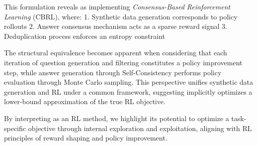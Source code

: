 This formulation reveals {\langname} as implementing \textit{Consensus-Based Reinforcement Learning} (CBRL), where:  
1. Synthetic data generation corresponds to policy rollouts  
2. Answer consensus mechanism acts as a sparse reward signal  
3. Deduplication process enforces an entropy constraint  

The structural equivalence becomes apparent when considering that each iteration of question generation and filtering constitutes a policy improvement step, while answer generation through Self-Consistency performs policy evaluation through Monte Carlo sampling. This perspective unifies synthetic data generation and RL under a common framework, suggesting {\langname} implicitly optimizes a lower-bound approximation of the true RL objective.  

By interpreting {\langname} as an RL method, we highlight its potential to optimize a task-specific objective through internal exploration and exploitation, aligning with RL principles of reward shaping and policy improvement.




